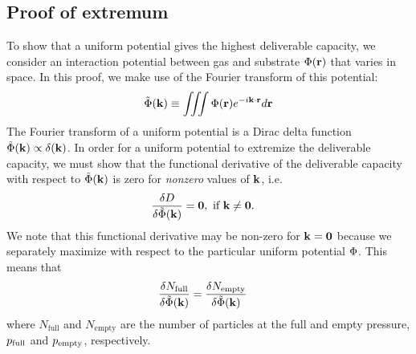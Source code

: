 \subsection{Proof of extremum}\label{sec:proof-extremum}
To show that a uniform potential gives the highest deliverable capacity, we
consider an interaction potential between gas and substrate $\Phi(\mathbf{r})$ that
varies in space.  In this proof, we make use of the Fourier transform of
this potential:
\begin{align}
    \tilde\Phi(\mathbf{k}) \equiv \iiint \Phi(\mathbf{r}) e^{-i\mathbf{k}\cdot \mathbf{r}} d\mathbf{r}
\end{align}
The Fourier transform of a uniform potential is a Dirac delta function $\tilde{\Phi}(\mathbf{k})\propto\delta(\mathbf{k})$. In order for a uniform potential
to extremize the deliverable capacity, we must show that the functional
derivative of the deliverable capacity with respect to $\tilde\Phi(\mathbf{k})$ is zero for
\emph{nonzero} values of $\mathbf{k}$, i.e.
\begin{align}
    \frac{\delta D}{\delta \tilde\Phi(\mathbf{k})} &= \mathbf{0}, \text{ if } \mathbf{k}\ne \mathbf{0}.
\end{align}
We note that this functional derivative may be non-zero for $\mathbf{k}=\mathbf{0}$
because we separately maximize with respect to the particular uniform potential
$\Phi$. This means that
\begin{align}
    \frac{\delta N_\text{full}}{\delta \tilde\Phi(\mathbf{k})} &= \frac{\delta N_\text{empty}}{\delta \tilde\Phi(\mathbf{k})}
\end{align}
where $N_\text{full}$ and $N_\text{empty}$ are the number of particles at the full and empty pressure, $p_{\text{full}}$ and $p_{\text{empty}}$, respectively.

